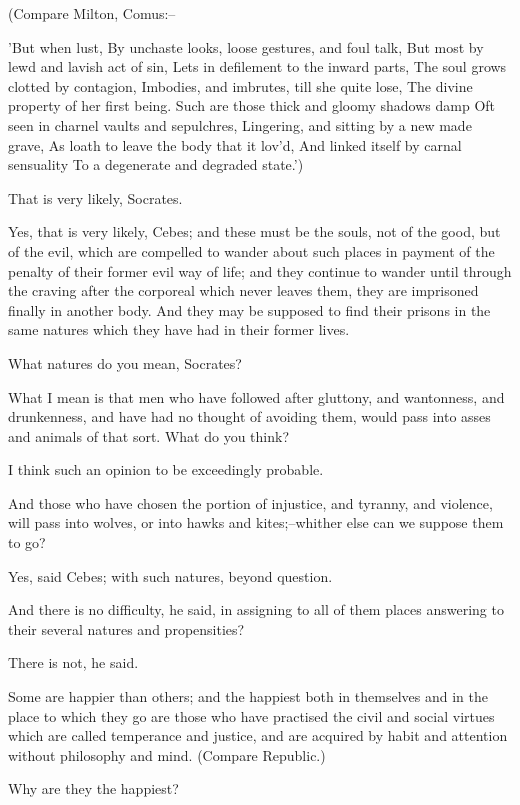 (Compare Milton, Comus:--

     'But when lust,
     By unchaste looks, loose gestures, and foul talk,
     But most by lewd and lavish act of sin,
     Lets in defilement to the inward parts,
     The soul grows clotted by contagion,
     Imbodies, and imbrutes, till she quite lose,
     The divine property of her first being.
     Such are those thick and gloomy shadows damp
     Oft seen in charnel vaults and sepulchres,
     Lingering, and sitting by a new made grave,
     As loath to leave the body that it lov'd,
     And linked itself by carnal sensuality
     To a degenerate and degraded state.')

That is very likely, Socrates.

Yes, that is very likely, Cebes; and these must be the souls, not of the
good, but of the evil, which are compelled to wander about such places
in payment of the penalty of their former evil way of life; and they
continue to wander until through the craving after the corporeal which
never leaves them, they are imprisoned finally in another body. And they
may be supposed to find their prisons in the same natures which they
have had in their former lives.

What natures do you mean, Socrates?

What I mean is that men who have followed after gluttony, and
wantonness, and drunkenness, and have had no thought of avoiding them,
would pass into asses and animals of that sort. What do you think?

I think such an opinion to be exceedingly probable.

And those who have chosen the portion of injustice, and tyranny, and
violence, will pass into wolves, or into hawks and kites;--whither else
can we suppose them to go?

Yes, said Cebes; with such natures, beyond question.

And there is no difficulty, he said, in assigning to all of them places
answering to their several natures and propensities?

There is not, he said.

Some are happier than others; and the happiest both in themselves and
in the place to which they go are those who have practised the civil and
social virtues which are called temperance and justice, and are acquired
by habit and attention without philosophy and mind. (Compare Republic.)

Why are they the happiest?

